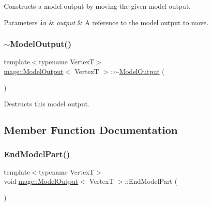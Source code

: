 Constructs a model output by moving the given model output.


\begin{DoxyParams}[1]{Parameters}
\mbox{\tt in}  & {\em output} & A reference to the model output to move. \\
\hline
\end{DoxyParams}
\hypertarget{structmage_1_1_model_output_a69a7f27486ad287943cbf973107ad8e1}{}\label{structmage_1_1_model_output_a69a7f27486ad287943cbf973107ad8e1} 
\subsubsection{\texorpdfstring{$\sim$\+Model\+Output()}{~ModelOutput()}}
{\footnotesize\ttfamily template$<$typename VertexT$>$ \\
\hyperlink{structmage_1_1_model_output}{mage\+::\+Model\+Output}$<$ VertexT $>$\+::$\sim$\hyperlink{structmage_1_1_model_output}{Model\+Output} (\begin{DoxyParamCaption}{ }\end{DoxyParamCaption})\hspace{0.3cm}{\ttfamily [default]}}

Destructs this model output. 

\subsection{Member Function Documentation}
\hypertarget{structmage_1_1_model_output_a5df0c4240b1fac61ac0cdbf9766bb98d}{}\label{structmage_1_1_model_output_a5df0c4240b1fac61ac0cdbf9766bb98d} 
\subsubsection{\texorpdfstring{End\+Model\+Part()}{EndModelPart()}}
{\footnotesize\ttfamily template$<$typename VertexT$>$ \\
void \hyperlink{structmage_1_1_model_output}{mage\+::\+Model\+Output}$<$ VertexT $>$\+::End\+Model\+Part (\begin{DoxyParamCaption}{ }\end{DoxyParamCaption})}

